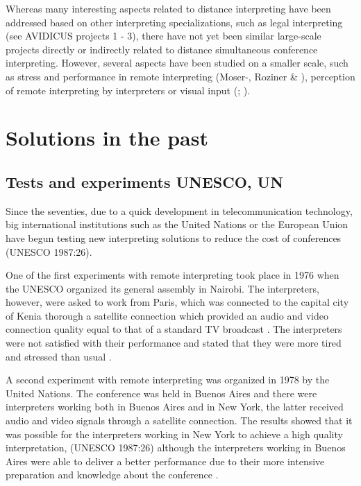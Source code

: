 \documentclass[output=paper]{langsci/langscibook}
\begin{document}
Whereas many interesting aspects related to distance interpreting have been addressed based on other interpreting specializations, such as legal interpreting (see AVIDICUS projects 1 - 3), there have not yet been similar large-scale projects directly or indirectly related to distance simultaneous conference interpreting. However, several aspects have been studied on a smaller scale, such as stress and performance in remote interpreting (Moser-\citealt{Mercer2003}, Roziner \& \citealt{Shlesinger2010}), perception of remote interpreting by interpreters \citep{Mouzourakis2006} or visual input (\citealt{Rennert2008}; \citealt{Luisetto2016}).

\section{Solutions in the past}
\subsection{Tests and experiments UNESCO, UN}

Since the seventies, due to a quick development in telecommunication technology, big international institutions such as the United Nations or the European Union have begun testing new interpreting solutions to reduce the cost of conferences (UNESCO 1987:26).

One of the first experiments with remote interpreting took place in 1976 when the UNESCO organized its general assembly in Nairobi. The interpreters, however, were asked to work from Paris, which was connected to the capital city of Kenia thorough a satellite connection which provided an audio and video connection quality equal to that of a standard TV broadcast \citep[30]{Mouzourakis1996}. The interpreters were not satisfied with their performance and stated that they were more tired and stressed than usual \citep[294]{Kurz2000}.

A second experiment with remote interpreting was organized in 1978 by the United Nations. The conference was held in Buenos Aires and there were interpreters working both in Buenos Aires and in New York, the latter received audio and video signals through a satellite connection. The results showed that it was possible for the interpreters working in New York to achieve a high quality interpretation, (UNESCO 1987:26) although the interpreters working in Buenos Aires were able to deliver a better performance due to their more intensive preparation and knowledge about the conference \citep[82-90]{Chernov2004}. 
\end{document}
